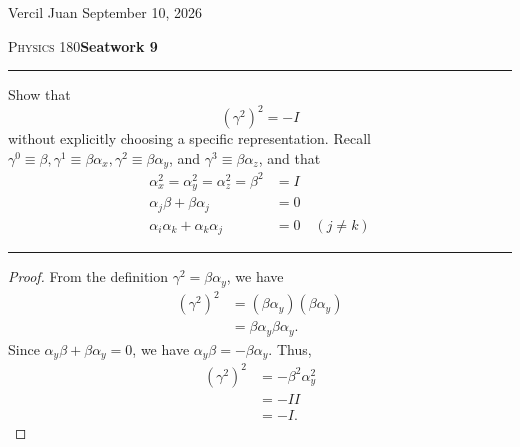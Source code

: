 \documentclass[8pt, a6paper]{article}
\begin{document}
{
	\noindent Vercil Juan \hfill September 10, 2026

	\noindent \textsc{Physics 180}\hfill \textbf{Seatwork 9}
	\vspace{1em}
	\hrule\vspace{5pt}
		Show that 
		\begin{equation}
			\label{eq:gamma}
			(\gamma^2)^2 = -I
		\end{equation}
		without explicitly choosing a specific representation. Recall
		$\gamma^0\equiv\beta, \gamma^1\equiv\beta\alpha_x, \gamma^2\equiv \beta \alpha_y$, and $\gamma^3 \equiv \beta \alpha_z$, and that
		\begin{align*}
		    \alpha_x^2 = 
		    \alpha_y^2 = 
		    \alpha_z^2 = 
			\beta^2 &= I\\
			\alpha_j \beta + \beta \alpha_j &= 0\\
			\alpha_i \alpha_k + \alpha_k \alpha_j &= 0\quad(j\neq k)
		\end{align*}
		\vspace{-5pt}
	\hrule
\begin{proof}
	From the definition $\gamma^2=\beta\alpha_y$, we have
	\begin{align*}
		(\gamma^2)^2
		&=(\beta\alpha_y)(\beta\alpha_y)\\
		&=\beta\alpha_y\beta\alpha_y.
	\end{align*}
	Since $\alpha_y\beta+\beta\alpha_y=0$, we have
	$\alpha_y\beta=-\beta\alpha_y$. Thus,
	\begin{align*}
		(\gamma^2)^2
		&=-\beta^2\alpha_y^2\\
		&=-I I\\
		&=-I.
	\end{align*}
\end{proof}
}
\end{document}
